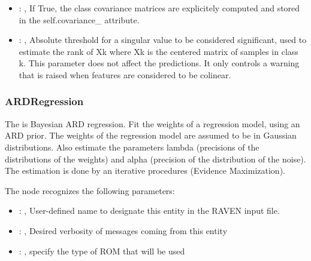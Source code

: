 \begin{itemize}
    \item {}: ,
      If True, the class covariance matrices are explicitely
      computed and stored in the self.covariance\_ attribute.

    \item {}: ,
      Absolute threshold for a singular value to be considered
      significant, used to estimate the rank of Xk where Xk is the centered
      matrix of samples in class k. This parameter does not affect
      the predictions. It only controls a warning that is raised when
      features are considered to be colinear.
  \end{itemize}


\subsubsection{ARDRegression}
  The  is Bayesian ARD regression.                             Fit the
  weights of a regression model, using an ARD prior. The weights of the
  regression model are assumed to be in Gaussian distributions. Also estimate the
  parameters lambda (precisions of the distributions of the weights) and
  alpha (precision of the distribution of the noise).                             The estimation is
  done by an iterative procedures (Evidence Maximization).

  The  node recognizes the following parameters:
    \begin{itemize}
      \item {}: ,
        User-defined name to designate this entity in the RAVEN input file.
      \item {}: ,
        Desired verbosity of messages coming from this entity
      \item {}: ,
        specify the type of ROM that will be used
  \end{itemize}

